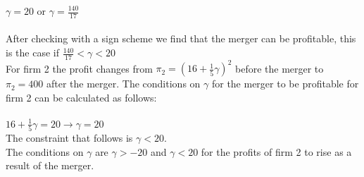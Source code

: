 \documentclass[a4paper]{article}
\begin{document}
\begin{enumerate}[(a)]
$ \gamma=20 $ or $ \gamma=\frac{140}{17}$
\\ \\
After checking with a sign scheme we find that the merger can be profitable, this is the case if $\frac{140}{17}<\gamma<20$
\\
For firm 2 the profit changes from $\pi_2=(16+\frac{1}{5}\gamma)^2$ before the merger to $\pi_2=400$ after the merger. The conditions on $\gamma$ for the merger to be profitable for firm 2 can be calculated as follows:\\
\\
$16+\frac{1}{5}\gamma=20 \rightarrow \gamma=20$\\
The constraint that follows is $\gamma<20$. \\The conditions on $\gamma$ are $\gamma>-20$ and $\gamma<20$ for the profits of firm 2 to rise as a result of the merger.  

\end{enumerate}
\end{document}
